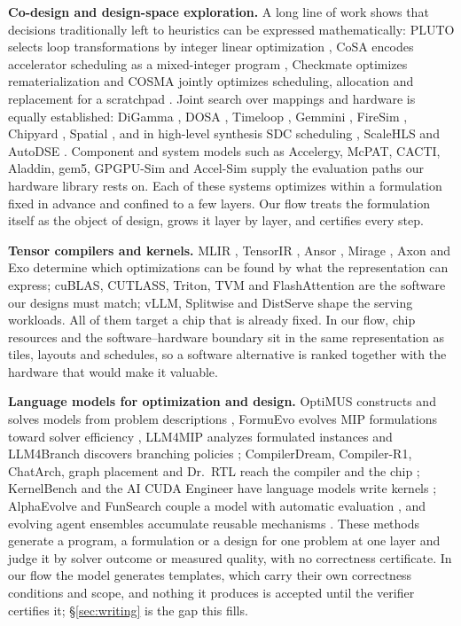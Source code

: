 \documentclass[11pt]{article}
\begin{document}
\textbf{Co-design and design-space exploration.} A long line of work shows that decisions traditionally left to heuristics can be expressed mathematically: PLUTO selects loop transformations by integer linear optimization \cite{r28}, CoSA encodes accelerator scheduling as a mixed-integer program \cite{r9}, Checkmate optimizes rematerialization \cite{r15} and COSMA jointly optimizes scheduling, allocation and replacement for a scratchpad \cite{r16}. Joint search over mappings and hardware is equally established: DiGamma \cite{r17}, DOSA \cite{r10}, Timeloop \cite{r18}, Gemmini \cite{r19}, FireSim \cite{r20}, Chipyard \cite{r83}, Spatial \cite{r84}, and in high-level synthesis SDC scheduling \cite{r87}, ScaleHLS and AutoDSE \cite{r85,r86}. Component and system models such as Accelergy, McPAT, CACTI, Aladdin, gem5, GPGPU-Sim and Accel-Sim \cite{r54,r55,r56,r57,r58,r59,r60} supply the evaluation paths our hardware library rests on. Each of these systems optimizes within a formulation fixed in advance and confined to a few layers. Our flow treats the formulation itself as the object of design, grows it layer by layer, and certifies every step.

\textbf{Tensor compilers and kernels.} MLIR \cite{r21}, TensorIR \cite{r22}, Ansor \cite{r23}, Mirage \cite{r24}, Axon \cite{r25} and Exo \cite{r26,r27} determine which optimizations can be found by what the representation can express; cuBLAS, CUTLASS, Triton, TVM and FlashAttention \cite{r88,r75,r76,r79,r77,r78} are the software our designs must match; vLLM, Splitwise and DistServe \cite{r80,r81,r82} shape the serving workloads. All of them target a chip that is already fixed. In our flow, chip resources and the software--hardware boundary sit in the same representation as tiles, layouts and schedules, so a software alternative is ranked together with the hardware that would make it valuable.

\textbf{Language models for optimization and design.} OptiMUS constructs and solves models from problem descriptions \cite{r3}, FormuEvo evolves MIP formulations toward solver efficiency \cite{r4}, LLM4MIP analyzes formulated instances \cite{r29} and LLM4Branch discovers branching policies \cite{r32}; CompilerDream, Compiler-R1, ChatArch, graph placement and Dr.~RTL reach the compiler and the chip \cite{r30,r31,r6,r7,r8}; KernelBench and the AI CUDA Engineer have language models write kernels \cite{r73,r74}; AlphaEvolve and FunSearch couple a model with automatic evaluation \cite{r1,r2}, and evolving agent ensembles accumulate reusable mechanisms \cite{r5}. These methods generate a program, a formulation or a design for one problem at one layer and judge it by solver outcome or measured quality, with no correctness certificate. In our flow the model generates templates, which carry their own correctness conditions and scope, and nothing it produces is accepted until the verifier certifies it; §\ref{sec:writing} is the gap this fills.
\end{document}
